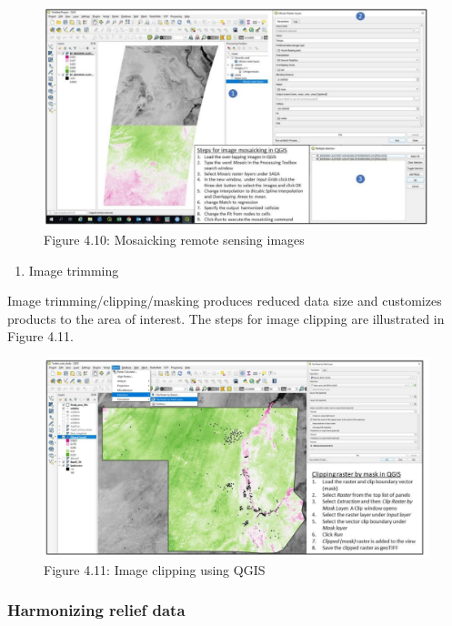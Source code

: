 \documentclass[
  10pt,
  b5paper,
]{book}
\providecommand{\tightlist}{%
  \setlength{\itemsep}{0pt}\setlength{\parskip}{0pt}}
\begin{document}
\begin{figure}
\centering
\includegraphics{figures/images/Figure4.10.PNG}
\caption{Figure 4.10: Mosaicking remote sensing images}
\end{figure}

\begin{enumerate}
\def\labelenumi{(\arabic{enumi})}
\setcounter{enumi}{2}
\tightlist
\item
  Image trimming
\end{enumerate}

Image trimming/clipping/masking produces reduced data size and customizes products to the area of interest. The steps for image clipping are illustrated in Figure 4.11.

\begin{figure}
\centering
\includegraphics{figures/images/Figure4.11.PNG}
\caption{Figure 4.11: Image clipping using QGIS}
\end{figure}

\hypertarget{harmonizing-relief-data}{%
\subsubsection{Harmonizing relief data}\label{harmonizing-relief-data}}
\end{document}

